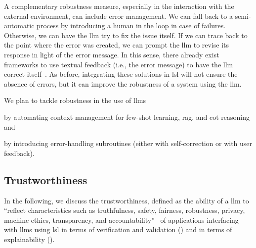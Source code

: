 \documentclass[manuscript,screen]{acmart}
\begin{document}

A complementary robustness measure, especially in the interaction with the external environment, can include error management.
We can fall back to a semi-automatic process by introducing a human in the loop in case of failures.
Otherwise, we can have the \ac{llm} try to fix the issue itself.
If we can trace back to the point where the error was created, we can prompt the \ac{llm} to revise its response in light of the error message.
In this sense, there already exist frameworks to use textual feedback (i.e., the error message) to have the \ac{llm} correct itself~\cite{DBLP:conf/nips/ShinnCGNY23}.
As before, integrating these solutions in \ac{lsl} will not ensure the absence of errors, but it can improve the robustness of a system using the \ac{llm}.

\begin{tcolorbox}[
    title=Robustness, %
    left=1mm,
    right=1mm,
    top=1mm,
    bottom=1mm,
    fonttitle=\bfseries, %
    boxrule=0.5pt, %
    arc=5pt, %
    width=\columnwidth %
]
We plan to tackle robustness in the use of \acp{llm}
\begin{enumerate*}[label=(\roman*)]
    \item by automating context management for few-shot learning, \ac{rag}, and \ac{cot} reasoning and
    \item by introducing error-handling subroutines (either with self-correction or with user feedback).
\end{enumerate*}
\end{tcolorbox}

\subsection{Trustworthiness}
\label{sec:trustworthiness}

In the following, we discuss the trustworthiness, defined as the ability of a \ac{llm} to \enquote{reflect characteristics such as truthfulness, safety, fairness, robustness, privacy, machine ethics, transparency, and accountability}~\cite{DBLP:conf/icml/Huang0WWZLGHLZL24} of applications interfacing with \acp{llm} using \ac{lsl} in terms of verification and validation () and in terms of explainability ().

\end{document}
